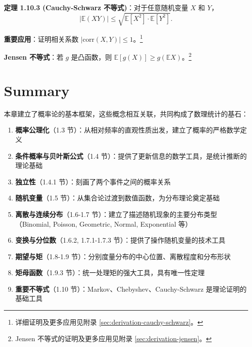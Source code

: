\begin{remark}
\textbf{定理 1.10.3 (Cauchy-Schwarz 不等式)}：对于任意随机变量 $X$ 和 $Y$，
\[
|\mathbb{E}(XY)| \leq \sqrt{\mathbb{E}[X^2] \cdot \mathbb{E}[Y^2]}.
\label{eq:cauchy-schwarz-ch1}
\]

\textbf{重要应用}：证明相关系数 $|\text{corr}(X,Y)| \leq 1$。\footnote{详细证明及更多应用见附录 \cref{sec:derivation-cauchy-schwarz}。}
\end{remark}

\textbf{Jensen 不等式}：若 $g$ 是凸函数，则 $\mathbb{E}[g(X)] \geq g(\mathbb{E}X)$。\footnote{Jensen 不等式的证明及更多应用见附录 \cref{sec:derivation-jensen}。}

\section*{Summary}\label{sec:chapter1-summary}

本章建立了概率论的基本框架，这些概念相互关联，共同构成了数理统计的基石：

\begin{enumerate}
    \item \textbf{概率公理化}（1.3 节）：从相对频率的直观性质出发，建立了概率的严格数学定义

    \item \textbf{条件概率与贝叶斯公式}（1.4 节）：提供了更新信息的数学工具，是统计推断的理论基础

    \item \textbf{独立性}（1.4.1 节）：刻画了两个事件之间的概率关系

    \item \textbf{随机变量}（1.5 节）：从集合论过渡到数值函数，为分布理论奠定基础

    \item \textbf{离散与连续分布}（1.6-1.7 节）：建立了描述随机现象的主要分布类型（Binomial, Poisson, Geometric, Normal, Exponential 等）

    \item \textbf{变换与分位数}（1.6.2, 1.7.1-1.7.3 节）：提供了操作随机变量的技术工具

    \item \textbf{期望与矩}（1.8-1.9 节）：分别度量分布的中心位置、离散程度和分布形状

    \item \textbf{矩母函数}（1.9.3 节）：统一处理矩的强大工具，具有唯一性定理

    \item \textbf{重要不等式}（1.10 节）：Markov、Chebyshev、Cauchy-Schwarz 是理论证明的基础工具
\end{enumerate}

